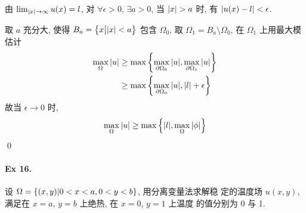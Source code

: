 \begin{solution}
由 $\lim_{{\lvert {x} \rvert} \to \infty} u(x) = l$, 对 $\forall\epsilon>0$, $\exists a>0$,
当 ${\lvert {x} \rvert}>a$ 时, 有 ${\lvert {u(x)-l} \rvert}<\epsilon$.

取 $a$ 充分大, 使得 $B_a = \big\{x \big| {\lvert {x} \rvert} < a\big\}$ 包含 $\Omega_0$, 取
$\Omega_1 = B_a \setminus \Omega_0$, 在 $\Omega_1$ 上用最大模估计
\begin{align*}
\max_{\Omega}{\lvert {u} \rvert} &\geq \max{\left\{ {
    \max_{\partial\Omega_0}{\lvert {u} \rvert}, \max_{\partial\Omega_1}{\lvert {u} \rvert}
} \right\}} \\
&\geq \max{\left\{ {
    \max_{\partial\Omega_0}{\lvert {u} \rvert}, {\lvert {l} \rvert} + \epsilon
} \right\}}
\end{align*}
故当 $\epsilon \to 0$ 时, 
\[ \max_\Omega{\lvert {u} \rvert} \geq \max{\left\{ {{\lvert {l} \rvert},\max_\Omega{\lvert {\phi} \rvert}} \right\}} \]
\qed
\end{solution}
\paragraph{Ex 16.}
设 $\Omega = {\left\{ {(x, y) | 0 < x < a, 0 < y < b} \right\}}$, 用分离变量法求解稳
定的温度场 $u(x, y)$, 满足在 $x = a$, $y = b$ 上绝热, 在 $x = 0$, $y = 1$ 上温度
的值分别为 0 与 1.

